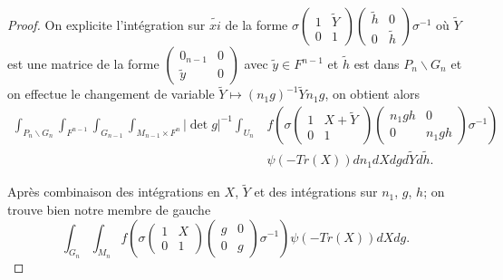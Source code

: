 \documentclass{amsart}
\begin{document}
\begin{proof}
On explicite l'intégration sur $\tilde{xi}$ de la forme $\sigma \begin{pmatrix}
1 & \tilde{Y} \\
0 & 1
\end{pmatrix}\begin{pmatrix}
\tilde{h} & 0 \\
0 & \tilde{h}
\end{pmatrix} \sigma^{-1}$
où $\tilde{Y}$ est une matrice de la forme $\begin{pmatrix}
0_{n-1} & 0 \\
\tilde{y} & 0
\end{pmatrix}$ avec $\tilde{y} \in F^{n-1}$ et $\tilde{h}$ est dans $P_n \backslash{G_n}$ et on effectue le changement de variable $\tilde{Y} \mapsto (n_1g)^{-1} \tilde{Y} n_1g$, on obtient alors
\begin{equation}
\begin{split}
\int_{P_n \backslash{G_n}} \int_{F^{n-1}} \int_{G_{n-1}} \int_{M_{n-1} \times F^n}  |\det g|^{-1}\int_{U_n} & f\left(\sigma \begin{pmatrix}
1 & X + \tilde{Y} \\
0 & 1
\end{pmatrix} \begin{pmatrix}
n_1gh & 0 \\
0 & n_1gh
\end{pmatrix} \sigma^{-1} \right) \\
& \psi(-Tr(X))  dn_1 dX dg d\tilde{Y} d\tilde{h}.
\end{split}
\end{equation}

Après combinaison des intégrations en $X$, $\tilde{Y}$ et des intégrations sur $n_1$, $g$, $h$; on trouve bien notre membre de gauche
\begin{equation}
\int_{G_n} \int_{M_n}  f\left(\sigma \begin{pmatrix}
1 & X \\
0 & 1
\end{pmatrix} \begin{pmatrix}
g & 0 \\
0 & g
\end{pmatrix} \sigma^{-1} \right) \psi(-Tr(X))  dX dg.
\end{equation}


\end{proof}
\end{document}
